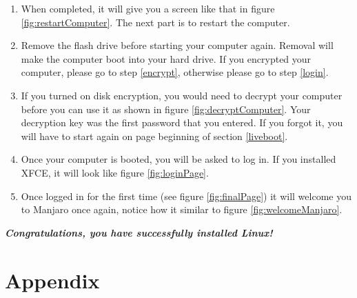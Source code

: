 \documentclass{article}
\begin{document}
\begin{enumerate}
    \item When completed, it will give you a screen like that in figure \ref{fig:restartComputer}. The next part is to restart the computer.
    \item Remove the flash drive before starting your computer again. Removal will make the computer boot into your hard drive. If you encrypted your computer, please go to step \ref{encrypt}, otherwise please go to step \ref{login}.
    \item\label{decrypt} If you turned on disk encryption, you would need to decrypt your computer before you can use it as shown in figure \ref{fig:decryptComputer}. Your decryption key was the first password that you entered. If you forgot it, you will have to start again on page \pageref{liveboot} beginning of section \ref{liveboot}.
    \item\label{login} Once your computer is booted, you will be asked to log in. If you installed XFCE, it will look like figure \ref{fig:loginPage}. 
    \item Once logged in for the first time (see figure \ref{fig:finalPage}) it will welcome you to Manjaro once again, notice how it similar to figure \ref{fig:welcomeManjaro}. 
\end{enumerate}

\textbf{\textit{Congratulations, you have successfully installed Linux!}}



\section{Appendix}\label{appendix}
\end{document}
